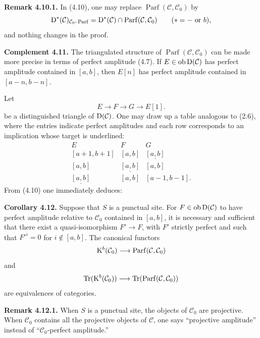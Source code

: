 \documentclass[11pt]{article}
\newcommand{\Parf}{\operatorname{Parf}}
\begin{document}
\textbf{Remark 4.10.1.} In (4.10), one may replace \(\Parf(\mathcal C,\mathcal C_0)\) by
\[
  \Dpx^*(\mathcal C)_{\mathcal C_0\text{-}\Parf}
  =\Dpx^*(\mathcal C)\cap\Parf(\mathcal C,\mathcal C_0)
  \qquad(*=-\text{ or }b),
\]
and nothing changes in the proof.

\textbf{Complement 4.11.} The triangulated structure of \(\Parf(\mathcal C,\mathcal C_0)\) can be made more precise in terms of perfect amplitude (4.7). If \(E\in\Ob\Dpx(\mathcal C)\) has perfect amplitude contained in \([a,b]\), then \(E[n]\) has perfect amplitude contained in \([a-n,b-n]\).

Let
\[
  E\longrightarrow F\longrightarrow G\longrightarrow E[1].
\]
be a distinguished triangle of \(\Dpx(\mathcal C)\). One may draw up a table analogous to (2.6), where the entries indicate perfect amplitudes and each row corresponds to an implication whose target is underlined:
\[
\begin{array}{ccc}
E&F&G\\[0.3em]
{}[a+1,b+1]&{}[a,b]&\underline{[a,b]}\\
{}[a,b]&\underline{[a,b]}&{}[a,b]\\
\underline{[a,b]}&{}[a,b]&{}[a-1,b-1].
\end{array}
\]
From (4.10) one immediately deduces:

\textbf{Corollary 4.12.} Suppose that \(S\) is a punctual site. For \(F\in\Ob\Dpx(\mathcal C)\) to have perfect amplitude relative to \(\mathcal C_0\) contained in \([a,b]\), it is necessary and sufficient that there exist a quasi-isomorphism \(F'\to F\), with \(F'\) strictly perfect and such that \(F'^i=0\) for \(i\notin[a,b]\). The canonical functors
\[
  \Kpx^b(\mathcal C_0)\longrightarrow\Parf(\mathcal C,\mathcal C_0)
\]
and
\[
  \Tr(\Kpx^b(\mathcal C_0))\longrightarrow\Tr(\Parf(\mathcal C,\mathcal C_0))
\]
are equivalences of categories.

\textbf{Remark 4.12.1.} When \(S\) is a punctual site, the objects of \(\mathcal C_0\) are projective. When \(\mathcal C_0\) contains all the projective objects of \(\mathcal C\), one says ``projective amplitude'' instead of ``\(\mathcal C_0\)-perfect amplitude.''



\providecommand{\Cpx}{\mathrm C}
\providecommand{\Kpx}{\mathrm K}
\providecommand{\Dpx}{\mathrm D}
\providecommand{\Ho}{\mathrm H}
\providecommand{\Ob}{\operatorname{ob}}
\providecommand{\qis}{\xrightarrow{\sim}}
\providecommand{\RHom}{\mathrm R\!\Hom}
\providecommand{\Ext}{\operatorname{Ext}}
\providecommand{\Hom}{\operatorname{Hom}}
\providecommand{\Tr}{\operatorname{Tr}}
\end{document}
